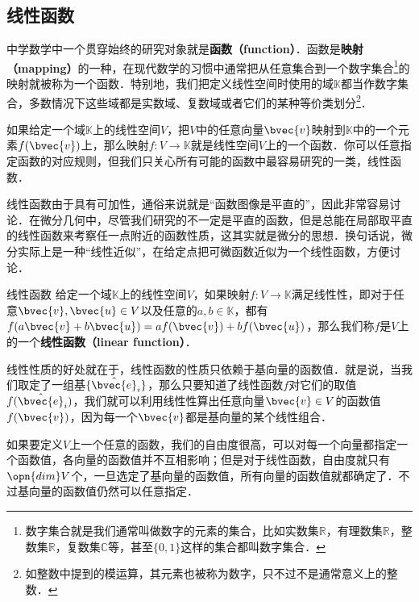 


\subsection{线性函数}

中学数学中一个贯穿始终的研究对象就是\textbf{函数（function）}．函数是\textbf{映射（mapping）}的一种，在现代数学的习惯中通常把从任意集合到一个数字集合\footnote{数字集合就是我们通常叫做数字的元素的集合，比如实数集$\mathbb{R}$，有理数集$\mathbb{R}$，整数集$\mathbb{R}$，复数集$\mathbb{C}$等，甚至$\{0, 1\}$这样的集合都叫数字集合．}的映射就被称为一个函数．特别地，我们把定义线性空间时使用的域$\mathbb{K}$都当作数字集合，多数情况下这些域都是实数域、复数域或者它们的某种等价类划分\footnote{如整数中提到的模运算，其元素也被称为数字，只不过不是通常意义上的整数．}．

如果给定一个域$\mathbb{K}$上的线性空间$V$，把$V$中的任意向量$\bvec{v}$映射到$\mathbb{K}$中的一个元素$f(\bvec{v})$上，那么映射$f:V\rightarrow\mathbb{K}$就是线性空间$V$上的一个函数．你可以任意指定函数的对应规则，但我们只关心所有可能的函数中最容易研究的一类，线性函数．

线性函数由于具有可加性，通俗来说就是“函数图像是平直的”，因此非常容易讨论．在微分几何中，尽管我们研究的不一定是平直的函数，但是总能在局部取平直的线性函数来考察任一点附近的函数性质，这其实就是微分的思想．换句话说，微分实际上是一种“线性近似”，在给定点把可微函数近似为一个线性函数，方便讨论．

\begin{definition}{线性函数}
给定一个域$\mathbb{K}$上的线性空间$V$，如果映射$f:V\rightarrow\mathbb{K}$满足线性性，即对于任意$\bvec{v}, \bvec{u}\in V$以及任意的$a, b\in\mathbb{K}$，都有$f(a\bvec{v}+b\bvec{u})=af(\bvec{v})+bf(\bvec{u})$，那么我们称$f$是$V$上的一个\textbf{线性函数（linear function）}．
\end{definition}

线性性质的好处就在于，线性函数的性质只依赖于基向量的函数值．就是说，当我们取定了一组基$\{\hat{\bvec{e}}_i\}$，那么只要知道了线性函数$f$对它们的取值$f(\hat{\bvec{e}}_i)$，我们就可以利用线性性算出任意向量$\bvec{v}\in V$的函数值$f(\bvec{v})$，因为每一个$\bvec{v}$都是基向量的某个线性组合．

如果要定义$V$上一个任意的函数，我们的自由度很高，可以对每一个向量都指定一个函数值，各向量的函数值并不互相影响；但是对于线性函数，自由度就只有$\opn{dim} V$个，一旦选定了基向量的函数值，所有向量的函数值就都确定了．不过基向量的函数值仍然可以任意指定．

